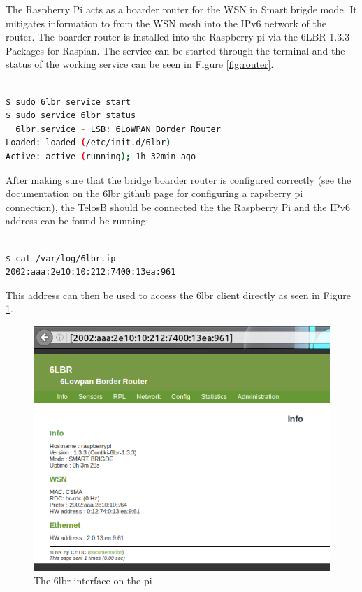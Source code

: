 The Raspberry Pi acts as a boarder router for the WSN in Smart brigde mode. It mitigates information to from the WSN mesh into the IPv6 network of the router. The boarder router is installed into the Raspberry pi via the 6LBR-1.3.3 Packages for Raspian. The service can be started through the terminal and the status of the working service can be seen in Figure \ref{fig:router}.

\begin{lstlisting}[basicstyle=\small,language=bash,caption={Start the 6lbr service and check the status}]

$ sudo 6lbr service start
$ sudo service 6lbr status
  6lbr.service - LSB: 6LoWPAN Border Router
Loaded: loaded (/etc/init.d/6lbr)
Active: active (running); 1h 32min ago
\end{lstlisting}

After making sure that the bridge boarder router is configured correctly (see the documentation on the 6lbr github page for configuring a rapsberry pi connection), the TelosB should be connected the the Raspberry Pi and the IPv6 address can be found be running: 
 
\begin{lstlisting}[basicstyle=\small,language=bash,caption={Get the TelosB node IPv6 address for accessing the 6lbr client}]

$ cat /var/log/6lbr.ip 
2002:aaa:2e10:10:212:7400:13ea:961
\end{lstlisting}

This address can then be used to access the 6lbr client directly as seen in Figure \ref{fig:interface}.

\begin{figure}[!h]
	\begin{center}
		\includegraphics[width=1\linewidth]{interface}
		\caption{The 6lbr interface on the pi}
		\label{fig:interface}
	\end{center}
\end{figure} 

